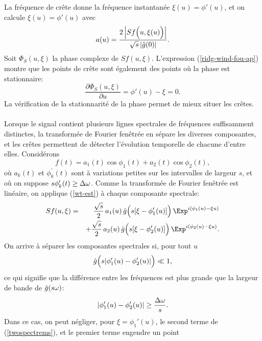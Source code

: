 La fr\'{e}quence de cr\^{e}te donne la fr\'{e}quence instantan\'{e}e
$\xi(u) = \phi'(u)$, et on calcule $\xi(u) = \phi'(u)$ avec
\begin{equation}
\label{compute-freq}
a(u) = \frac {2\, \Bigl|Sf\Bigl(u,\xi (u)\Bigr)\Bigr|}
{\sqrt s\, |\hat g(0)|} .
\end{equation}
Soit $\Phi_S (u,\xi)$ la phase complexe de  $Sf(u,\xi)$.
L'expression 
(\ref{ridg-wind-fou-ap}) montre que les points de cr\^{e}te sont 
\'{e}galement des points o\`{u} la phase est stationnaire:
\[
\frac {\partial \Phi_S  (u,\xi )} {\partial u} = \phi' (u) -
\xi  = 0 .
\]
La v\'{e}rification de la stationnarit\'{e} de la phase permet de 
mieux situer les cr\^{e}tes.
\\
\\
Lorsque le signal contient plusieurs lignes spectrales de 
fr\'{e}quences suffisamment distinctes, la transform\'{e}e de Fourier 
fen\^{e}tr\'{e}e en s\'{e}pare les diverses composantes, et les 
cr\^{e}tes permettent de d\'{e}tecter l'\'{e}volution temporelle de chacune d'entre 
elles. Consid\'{e}rons
\[
f(t) = a_1 (t) \cos \phi_1 (t) + a_2 (t) \cos \phi_2 (t) ,
\]
o\`{u} $a_k (t)$ et $\phi^\prime_k (t)$ sont \`{a} variations petites 
sur les intervalles de largeur $s$, et o\`{u} on suppose
$s \phi^\prime_k	(t)	\geq \Delta	{\omega}$.
Comme la 
transform\'{e}e de Fourier fen\^{e}tr\'{e}e est lin\'{e}aire, on 
applique (\ref{wt-est}) \`{a} chaque composante spectrale:
\begin{eqnarray}
\label{twospectrems}
Sf(u, \xi ) & = & 
\frac {\sqrt s } 2  \,a_1 (u)\,
\hat g\Bigl(s[\xi - \phi_1 '(u)]\Bigr) \,\Exp^{ i (\phi_1 (u) - \xi u)} \nonumber \\
&  & +
\frac {\sqrt s}  2  \,a_2 (u)\,
\hat g\Bigl(s[\xi - \phi_2 '(u)]\Bigr) \,\Exp^{ i (\phi_2 (u) - \xi u)} .
\end{eqnarray}
On arrive \`{a} s\'{e}parer les composantes spectrales si, pour tout $u$
\begin{equation}
\label{separ8}
\hat g\Bigl(s |\phi_1 '(u) - \phi_2 '(u)|\Bigr) \ll 1 ,
\end{equation}
ce qui signifie que la diff\'{e}rence entre les fr\'{e}quences est 
plus grande que la largeur de bande de 	$\hat g(s {\omega})$:
\begin{equation}
\label{separ}
|\phi_1 '(u) - \phi_2 '(u) | \geq \frac{\Delta {\omega}} s .
\end{equation}
Dans ce cas, on peut n\'{e}gliger, pour $\xi = \phi_1 '(u)$, le second 
terme de (\ref{twospectrems}), et le premier terme engendre un point 
